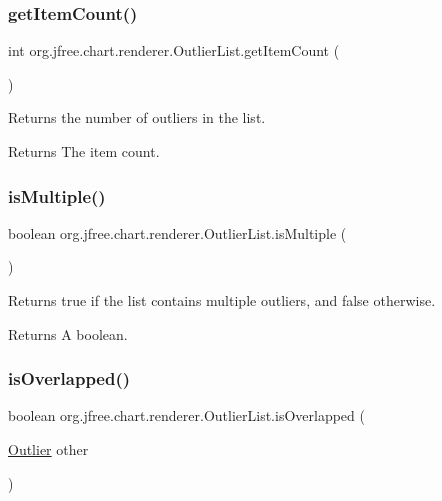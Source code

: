 \subsubsection{\texorpdfstring{get\+Item\+Count()}{getItemCount()}}
{\footnotesize\ttfamily int org.\+jfree.\+chart.\+renderer.\+Outlier\+List.\+get\+Item\+Count (\begin{DoxyParamCaption}{ }\end{DoxyParamCaption})}

Returns the number of outliers in the list.

\begin{DoxyReturn}{Returns}
The item count. 
\end{DoxyReturn}
\mbox{\label{classorg_1_1jfree_1_1chart_1_1renderer_1_1_outlier_list_aea765af5e62cfa1c14fd9bee0857c437}} 
\subsubsection{\texorpdfstring{is\+Multiple()}{isMultiple()}}
{\footnotesize\ttfamily boolean org.\+jfree.\+chart.\+renderer.\+Outlier\+List.\+is\+Multiple (\begin{DoxyParamCaption}{ }\end{DoxyParamCaption})}

Returns {\ttfamily true} if the list contains multiple outliers, and {\ttfamily false} otherwise.

\begin{DoxyReturn}{Returns}
A boolean. 
\end{DoxyReturn}
\mbox{\label{classorg_1_1jfree_1_1chart_1_1renderer_1_1_outlier_list_a156a0cd0c31f4ce86e25ea067c800903}} 
\subsubsection{\texorpdfstring{is\+Overlapped()}{isOverlapped()}}
{\footnotesize\ttfamily boolean org.\+jfree.\+chart.\+renderer.\+Outlier\+List.\+is\+Overlapped (\begin{DoxyParamCaption}\item[{\mbox{\hyperlink{classorg_1_1jfree_1_1chart_1_1renderer_1_1_outlier}{Outlier}}}]{other }\end{DoxyParamCaption})}

